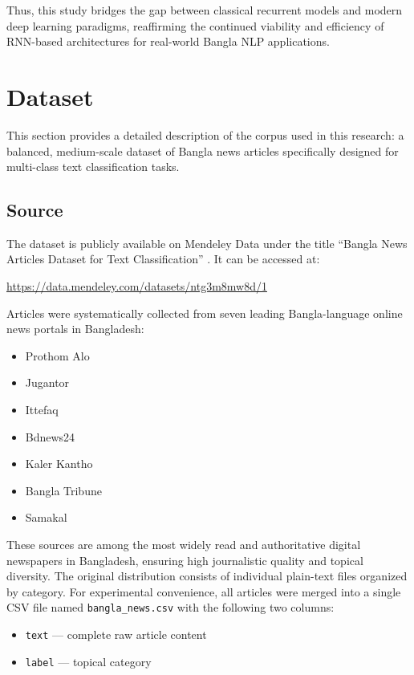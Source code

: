 \documentclass[pdflatex,sn-mathphys-num]{sn-jnl}
\theoremstyle{thmstyleone}\newtheorem{theorem}{Theorem}
\theoremstyle{thmstyletwo}\newtheorem{example}{Example}\newtheorem{remark}{Remark}
\theoremstyle{thmstylethree}\newtheorem{definition}{Definition}
\begin{document}
Thus, this study bridges the gap between classical recurrent models and modern deep learning paradigms, reaffirming the continued viability and efficiency of RNN-based architectures for real-world Bangla NLP applications.

\section{Dataset}
\label{sec:dataset}

This section provides a detailed description of the corpus used in this research: a balanced, medium-scale dataset of Bangla news articles specifically designed for multi-class text classification tasks.

\subsection{Source}
\label{subsec:source}

The dataset is publicly available on Mendeley Data under the title ``Bangla News Articles Dataset for Text Classification'' \cite{bangla-news-dataset-2021}. It can be accessed at:

\begin{center}
    \url{https://data.mendeley.com/datasets/ntg3m8mw8d/1}
\end{center}

Articles were systematically collected from seven leading Bangla-language online news portals in Bangladesh:
\begin{itemize}
    \item Prothom Alo
    \item Jugantor
    \item Ittefaq
    \item Bdnews24
    \item Kaler Kantho
    \item Bangla Tribune
    \item Samakal
\end{itemize}

These sources are among the most widely read and authoritative digital newspapers in Bangladesh, ensuring high journalistic quality and topical diversity. The original distribution consists of individual plain-text files organized by category. For experimental convenience, all articles were merged into a single CSV file named \texttt{bangla\_news.csv} with the following two columns:
\begin{itemize}
    \item \texttt{text} — complete raw article content
    \item \texttt{label} — topical category
\end{itemize}
\end{document}
